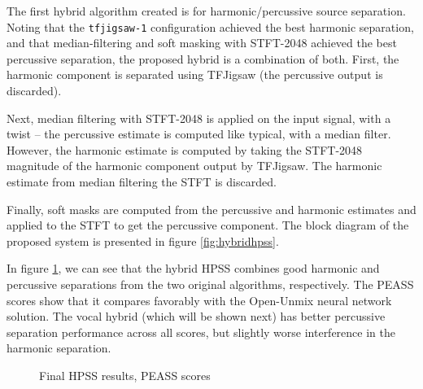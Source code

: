 \documentclass[letter,12pt]{article}
\begin{document}
The first hybrid algorithm created is for harmonic/percussive source separation. Noting that the \Verb#tfjigsaw-1# configuration achieved the best harmonic separation, and that median-filtering and soft masking with STFT-2048 achieved the best percussive separation, the proposed hybrid is a combination of both. First, the harmonic component is separated using TFJigsaw (the percussive output is discarded).

Next, median filtering with STFT-2048 is applied on the input signal, with a twist -- the percussive estimate is computed like typical, with a median filter. However, the harmonic estimate is computed by taking the STFT-2048 magnitude of the harmonic component output by TFJigsaw. The harmonic estimate from median filtering the STFT is discarded.

Finally, soft masks are computed from the percussive and harmonic estimates and applied to the STFT to get the percussive component. The block diagram of the proposed system is presented in figure \ref{fig:hybridhpss}.

In figure \ref{fig:finalhpss}, we can see that the hybrid HPSS combines good harmonic and percussive separations from the two original algorithms, respectively. The PEASS scores show that it compares favorably with the Open-Unmix neural network solution. The vocal hybrid (which will be shown next) has better percussive separation performance across all scores, but slightly worse interference in the harmonic separation.

\begin{figure}[ht]
	\centering
	\vspace{-1.25em}
	\caption{Final HPSS results, PEASS scores}
	\label{fig:finalhpss}
\end{figure}
\end{document}
